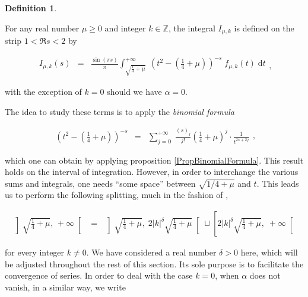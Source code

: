 \documentclass{jams-l}
\theoremstyle{definition}
\newtheorem{definition}[theorem]{Definition}
\theoremstyle{remark}
\numberwithin{equation}{section}
\begin{document}
        \begin{definition}
        \label{DefImuk}
        
            For any real number $\mu \geqslant 0$ and integer $k \in \mathbb{Z}$, the integral $I_{\mu,k}$  is defined on the strip $1 < \Re s < 2$ by
            
            \[ \begin{array}{lll}
                    I_{\mu, k} \left( s \right) & = & \displaystyle \frac{\sin \left( \pi s \right)}{\pi} \int_{\sqrt{\frac{1}{4}+\mu}}^{+\infty} \; \left( t^2 - \left( \frac{1}{4} + \mu \right) \right)^{-s} \; f_{\mu,k} \left( t \right) \; \text{d}t
                \end{array} , \]
            
            \noindent with the exception of $k = 0$ should we have $\alpha = 0$.
        
        \end{definition}
        
        The idea to study these terms is to apply the \textit{binomial formula}
        
        \[ \begin{array}{lll}
                \left( t^2 - \left( \frac{1}{4} + \mu \right) \right)^{-s} & = & \sum\limits_{j = 0}^{+ \infty} \; \frac{\left( s \right)_j}{j!} \left( \frac{1}{4} + \mu \right)^j \cdot \frac{1}{t^{2s+2j}}
            \end{array} , \]
            
        \noindent which one can obtain by applying proposition \ref{PropBinomialFormula}. This result holds on the interval of integration. However, in order to interchange the various sums and integrals, one needs ``some space'' between $\sqrt{1/4 + \mu}$ and $t$. This leads us to perform the following splitting, much in the fashion of \cite{MR4167014},
        
        \begin{equation}
        \label{EqSplittingkneq0}
            \begin{array}{lll}
                \left] \sqrt{\frac{1}{4} + \mu}, \, + \infty \right[ & = & \left] \sqrt{\frac{1}{4} + \mu}, \; 2 \left \vert k \right \vert^{\delta} \sqrt{\frac{1}{4} + \mu} \right[ \sqcup \left[ 2 \left \vert k \right \vert^{\delta} \sqrt{\frac{1}{4} + \mu}, \; +\infty \right[
            \end{array}
        \end{equation}
        
        \noindent for every integer $k \neq 0$. We have considered a real number $\delta > 0$ here, which will be adjusted throughout the rest of this section. Its sole purpose is to facilitate the convergence of series. In order to deal with the case $k = 0$, when $\alpha$ does not vanish, in a similar way, we write
        
\end{document}
